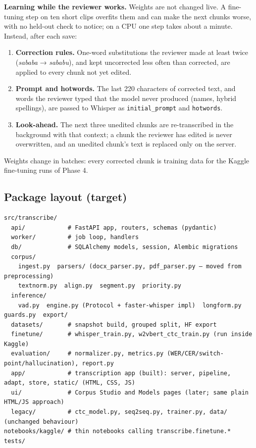 \documentclass[11pt]{article}
\begin{document}
\textbf{Learning while the reviewer works.} Weights are not changed live. A fine-tuning step on ten short clips overfits them and can make the next chunks worse, with no held-out check to notice; on a CPU one step takes about a minute. Instead, after each save:
\begin{enumerate}
\tightlist
\item
  \textbf{Correction rules.} One-word substitutions the reviewer made at least twice (\emph{sababa} → \emph{sababu}), and kept uncorrected less often than corrected, are applied to every chunk not yet edited.
\item
  \textbf{Prompt and hotwords.} The last 220 characters of corrected text, and words the reviewer typed that the model never produced (names, hybrid spellings), are passed to Whisper as \texttt{initial\_prompt} and \texttt{hotwords}.
\item
  \textbf{Look-ahead.} The next three unedited chunks are re-transcribed in the background with that context; a chunk the reviewer has edited is never overwritten, and an unedited chunk's text is replaced only on the server.
\end{enumerate}
Weights change in batches: every corrected chunk is training data for the Kaggle fine-tuning runs of Phase 4.

\hypertarget{package-layout-target}{%
\subsection{Package layout (target)}\label{package-layout-target}}

\begin{lstlisting}
src/transcribe/
  api/            # FastAPI app, routers, schemas (pydantic)
  worker/         # job loop, handlers
  db/             # SQLAlchemy models, session, Alembic migrations
  corpus/
    ingest.py  parsers/ (docx_parser.py, pdf_parser.py — moved from preprocessing)
    textnorm.py  align.py  segment.py  priority.py
  inference/
    vad.py  engine.py (Protocol + faster-whisper impl)  longform.py  guards.py  export/
  datasets/       # snapshot build, grouped split, HF export
  finetune/       # whisper_train.py, w2vbert_ctc_train.py (run inside Kaggle)
  evaluation/     # normalizer.py, metrics.py (WER/CER/switch-point/hallucination), report.py
  app/            # transcription app (built): server, pipeline, adapt, store, static/ (HTML, CSS, JS)
  ui/             # Corpus Studio and Models pages (later; same plain HTML/JS approach)
  legacy/         # ctc_model.py, seq2seq.py, trainer.py, data/ (unchanged behaviour)
notebooks/kaggle/ # thin notebooks calling transcribe.finetune.*
tests/
\end{lstlisting}
\end{document}
